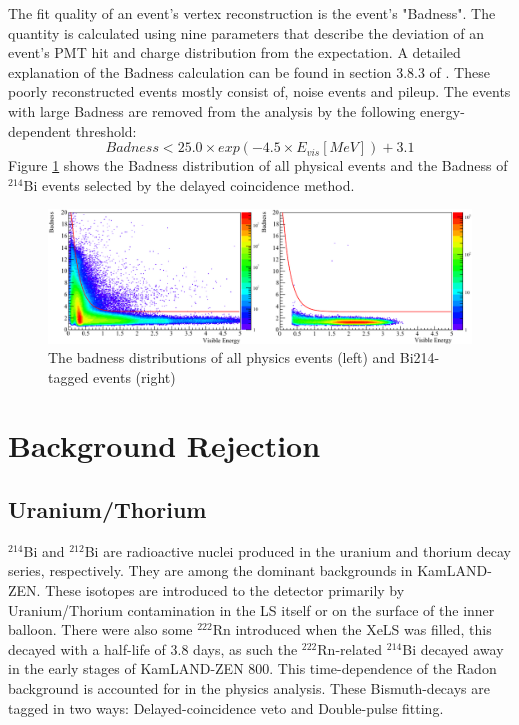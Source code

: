 \begin{enumerate}
	The fit quality of an event's vertex reconstruction is the event's "Badness". The quantity is calculated using nine parameters that describe the deviation of an event's PMT hit and charge distribution from the expectation. A detailed explanation of the Badness calculation can be found in section 3.8.3 of \cite{}. These poorly reconstructed events mostly consist of, noise events and pileup. The events with large Badness are removed from the analysis by the following energy-dependent threshold:
	\begin{equation}
		Badness < 25.0\times exp(-4.5\times E_{vis} [MeV]) + 3.1
	\end{equation}
	Figure \ref{fig:badness} shows the Badness distribution of all physical events and the Badness of $^{214}$Bi events selected by the delayed coincidence method.
	\begin{figure}[htb]
		\centering
        \includegraphics[scale=0.45]{badness.png}
        \caption{The badness distributions of all physics events (left) and Bi214-tagged events (right)}
        \label{fig:badness}
	\end{figure}
\end{enumerate}

\section{Background Rejection}
\subsection{Uranium/Thorium}
$^{214}$Bi and $^{212}$Bi are radioactive nuclei produced in the uranium and thorium decay series, respectively. They are among the dominant backgrounds in KamLAND-ZEN. These isotopes are introduced to the detector primarily by Uranium/Thorium contamination in the LS itself or on the surface of the inner balloon. There were also some $^{222}$Rn introduced when the XeLS was filled, this decayed with a half-life of 3.8 days, as such the $^{222}$Rn-related $^{214}$Bi decayed away in the early stages of KamLAND-ZEN 800. This time-dependence of the Radon background is accounted for in the physics analysis.
These Bismuth-decays are tagged in two ways: Delayed-coincidence veto and Double-pulse fitting.
